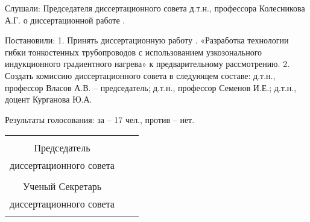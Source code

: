 Слушали: 
Председателя диссертационного совета д.т.н., профессора Колесникова А.Г. 
о диссертационной работе \thesisAuthorLastNameFrom.

Постановили:
1. Принять диссертационную работу \thesisAuthorLastNameFrom. «Разработка технологии гибки тонкостенных трубопроводов с использованием узкозонального индукционного градиентного нагрева» к предварительному рассмотрению.
2. Создать комиссию диссертационного совета в следующем составе:
д.т.н., профессор Власов А.В.  –  председатель;
д.т.н., профессор Семенов И.Е.;
д.т.н., доцент Курганова Ю.А.

Результаты голосования: за – 17 чел., против – нет.

\begin{center}
	\begin{tabular}[c]{c m{4cm} l}
		                        &            &                     \\
		     Председатель       &            &                     \\
		диссертационного совета & \hrulefill & \dcHeadFullFIO      \\
		    \dcHeadRegalia      &            &                     \\
		   Ученый Секретарь     &            &                     \\
		диссертационного совета & \hrulefill & \dcSecretaryFullFIO \\
		  \dcSecretaryRegalia   &            &
	\end{tabular}
\end{center}

\clearpage
